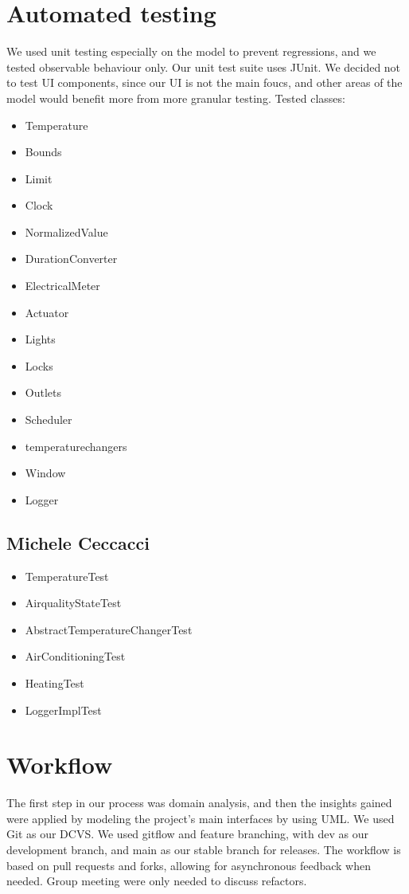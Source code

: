 \documentclass[a4paper,12pt]{report}
\begin{document}
\section{Automated testing}
We used unit testing especially on the model to prevent regressions, and we tested observable behaviour only.
Our unit test suite uses JUnit.
We decided not to test UI components, since our UI is not the main foucs,
and other areas of the model would benefit more from more granular testing. 
Tested classes:
\begin{itemize}
	\item Temperature
	\item Bounds
	\item Limit
	\item Clock
	\item NormalizedValue
	\item DurationConverter
	\item ElectricalMeter
	\item Actuator
	\item Lights
	\item Locks
	\item Outlets
	\item Scheduler
	\item temperaturechangers
	\item Window
	\item Logger
\end{itemize}

\subsection{Michele Ceccacci}
\begin{itemize}
	\item TemperatureTest
	\item AirqualityStateTest
	\item AbstractTemperatureChangerTest
	\item AirConditioningTest
	\item HeatingTest
	\item LoggerImplTest
\end{itemize}


\section{Workflow}
The first step in our process was domain analysis, and then the insights gained were applied by modeling 
the project's main interfaces by using UML.
We used Git as our DCVS. We used gitflow and feature branching, with dev as our development branch,
and main as our stable branch for releases. The workflow is based on pull requests and forks, allowing for asynchronous feedback when needed.
Group meeting were only needed to discuss refactors. 
\end{document}
